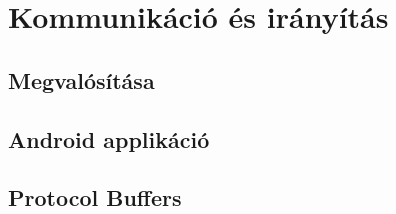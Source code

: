 \chapter{Kommunikáció és irányítás}\label{ch:KONTROLLER}
\section{Megvalósítása}\label{sec:KONTROLLER:megvalositas}
\section{Android applikáció}\label{sec:KONTROLLER:app}
\section{Protocol Buffers}\label{sec:KONTROLLER:protobuff}
